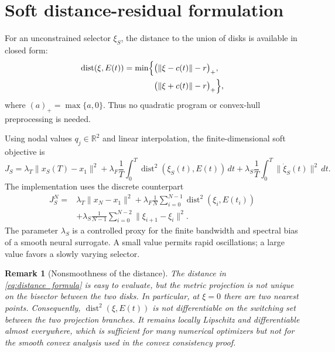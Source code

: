 \documentclass[11pt]{article}
\newtheorem{remark}[proposition]{Remark}
\newcommand{\R}{\mathbb{R}}
\newcommand{\dist}{\operatorname{dist}}
\begin{document}
\section{Soft distance-residual formulation}

For an unconstrained selector $\xi_S$, the distance to the union of disks is available in closed form:
\begin{equation}
\begin{split}
    \dist(\xi,E(t))
    =\min\Bigl\{&\bigl(\lVert\xi-c(t)\rVert-r\bigr)_+,\\
                   &\bigl(\lVert\xi+c(t)\rVert-r\bigr)_+\Bigr\},
\end{split}
    \label{eq:distance_formula}
\end{equation}
where $(a)_+=\max\{a,0\}$. Thus no quadratic program or convex-hull preprocessing is needed.

Using nodal values $q_j\in\R^2$ and linear interpolation, the finite-dimensional soft objective is
\begin{equation}
    J_S
    =\lambda_T\lVert x_S(T)-x_1\rVert^2
    +\lambda_F\frac{1}{T}\int_0^T\dist^2(\xi_S(t),E(t))\,dt
    +\lambda_S\frac{1}{T}\int_0^T\lVert\dot\xi_S(t)\rVert^2\,dt.
    \label{eq:soft_continuous}
\end{equation}
The implementation uses the discrete counterpart
\begin{equation}
\begin{split}
    J_S^{N}
    ={}&\lambda_T\lVert x_N-x_1\rVert^2
    +\lambda_F\frac{1}{N}\sum_{i=0}^{N-1}
       \dist^2(\xi_i,E(t_i))\\
    &+\lambda_S\frac{1}{N-1}\sum_{i=0}^{N-2}
       \lVert\xi_{i+1}-\xi_i\rVert^2.
\end{split}
    \label{eq:soft_discrete}
\end{equation}
The parameter $\lambda_S$ is a controlled proxy for the finite bandwidth and spectral bias of a smooth neural surrogate. A small value permits rapid oscillations; a large value favors a slowly varying selector.

\begin{remark}[Nonsmoothness of the distance]
The distance in \eqref{eq:distance_formula} is easy to evaluate, but the metric projection is not unique on the bisector between the two disks. In particular, at $\xi=0$ there are two nearest points. Consequently, $\dist^2(\xi,E(t))$ is not differentiable on the switching set between the two projection branches. It remains locally Lipschitz and differentiable almost everywhere, which is sufficient for many numerical optimizers but not for the smooth convex analysis used in the convex consistency proof.
\end{remark}
\end{document}
